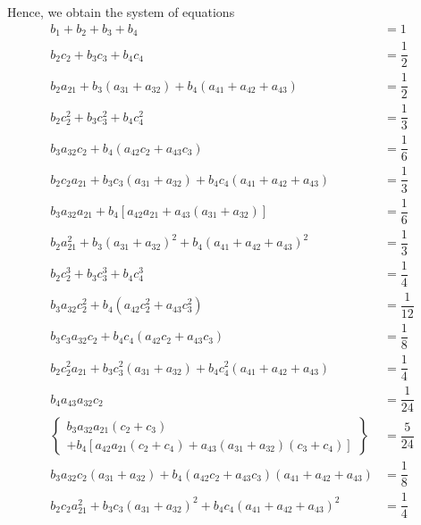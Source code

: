 \documentclass[a4paper,oneside]{book}
\numberwithin{equation}{chapter}
\begin{document}
Hence, we obtain the system of equations
\begin{align}
{b_1} + {b_2} + {b_3} + {b_4} &= 1\label{4.106}\\
{b_2}{c_2} + {b_3}{c_3} + {b_4}{c_4} &= \dfrac{1}{2}\\
{b_2}{a_{21}} + {b_3}\left( {{a_{31}} + {a_{32}}} \right) + {b_4}\left( {{a_{41}} + {a_{42}} + {a_{43}}} \right)& = \dfrac{1}{2}\\
{b_2}c_2^2 + {b_3}c_3^2 + {b_4}c_4^2 &= \dfrac{1}{3}\\
{b_3}{a_{32}}{c_2} + {b_4}\left( {{a_{42}}{c_2} + {a_{43}}{c_3}} \right) &= \dfrac{1}{6}\\
{b_2}{c_2}{a_{21}} + {b_3}{c_3}\left( {{a_{31}} + {a_{32}}} \right) + {b_4}{c_4}\left( {{a_{41}} + {a_{42}} + {a_{43}}} \right) &= \dfrac{1}{3}\\
{b_3}{a_{32}}{a_{21}} + {b_4}\left[ {{a_{42}}{a_{21}} + {a_{43}}\left( {{a_{31}} + {a_{32}}} \right)} \right] &= \dfrac{1}{6}\\
{b_2}a_{21}^2 + {b_3}{\left( {{a_{31}} + {a_{32}}} \right)^2} + {b_4}{\left( {{a_{41}} + {a_{42}} + {a_{43}}} \right)^2} &= \dfrac{1}{3}\\
{b_2}c_2^3 + {b_3}c_3^3 + {b_4}c_4^3 &= \dfrac{1}{4}\\
{b_3}{a_{32}}c_2^2 + {b_4}\left( {{a_{42}}c_2^2 + {a_{43}}c_3^2} \right) &= \dfrac{1}{{12}}\\
{b_3}{c_3}{a_{32}}{c_2} + {b_4}{c_4}\left( {{a_{42}}{c_2} + {a_{43}}{c_3}} \right) &= \dfrac{1}{8}\\
 {b_2}c_2^2{a_{21}} + {b_3}c_3^2\left( {{a_{31}} + {a_{32}}} \right) + {b_4}c_4^2\left( {{a_{41}} + {a_{42}} + {a_{43}}} \right) &= \dfrac{1}{4}\\
{b_4}{a_{43}}{a_{32}}{c_2} &= \dfrac{1}{{24}}\\
\left\{ \begin{array}{l}
{b_3}{a_{32}}{a_{21}}\left( {{c_2} + {c_3}} \right)\\
 + {b_4}\left[ {{a_{42}}{a_{21}}\left( {{c_2} + {c_4}} \right) + {a_{43}}\left( {{a_{31}} + {a_{32}}} \right)\left( {{c_3} + {c_4}} \right)} \right]
\end{array} \right\} &= \dfrac{5}{{24}}\\
{b_3}{a_{32}}{c_2}\left( {{a_{31}} + {a_{32}}} \right) + {b_4}\left( {{a_{42}}{c_2} + {a_{43}}{c_3}} \right)\left( {{a_{41}} + {a_{42}} + {a_{43}}} \right) &= \dfrac{1}{8}\\
{b_2}{c_2}a_{21}^2 + {b_3}{c_3}{\left( {{a_{31}} + {a_{32}}} \right)^2} + {b_4}{c_4}{\left( {{a_{41}} + {a_{42}} + {a_{43}}} \right)^2} &= \dfrac{1}{4}\\

\end{align}
\end{document}
